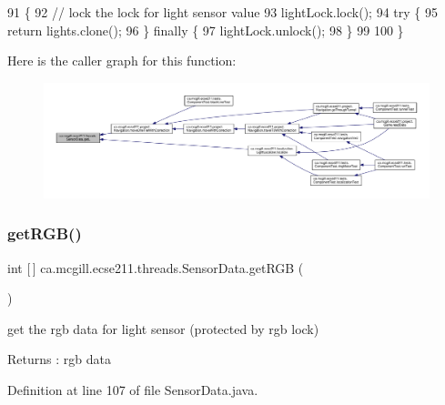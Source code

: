 \begin{DoxyCode}
91                          \{
92     \textcolor{comment}{// lock the lock for light sensor value}
93     lightLock.lock();
94     \textcolor{keywordflow}{try} \{
95       \textcolor{keywordflow}{return} lights.clone();
96     \} \textcolor{keywordflow}{finally} \{
97       lightLock.unlock();
98     \}
99 
100   \}
\end{DoxyCode}
Here is the caller graph for this function\+:\nopagebreak
\begin{figure}[H]
\begin{center}
\leavevmode
\includegraphics[width=350pt]{classca_1_1mcgill_1_1ecse211_1_1threads_1_1_sensor_data_a39eec50582f0e4bcff8a4669c48e1609_icgraph}
\end{center}
\end{figure}
\mbox{\label{classca_1_1mcgill_1_1ecse211_1_1threads_1_1_sensor_data_a76313564e284f5cdb66aefce4e595f3b}} 
\subsubsection{\texorpdfstring{get\+R\+G\+B()}{getRGB()}}
{\footnotesize\ttfamily int \mbox{[}$\,$\mbox{]} ca.\+mcgill.\+ecse211.\+threads.\+Sensor\+Data.\+get\+R\+GB (\begin{DoxyParamCaption}{ }\end{DoxyParamCaption})}

get the rgb data for light sensor (protected by rgb lock)

\begin{DoxyReturn}{Returns}
\+: rgb data 
\end{DoxyReturn}


Definition at line 107 of file Sensor\+Data.\+java.


